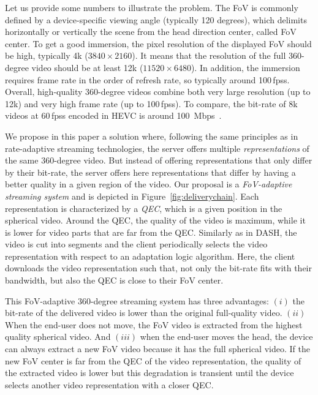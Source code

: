 Let us provide some numbers to illustrate the problem.
The \ac{FoV} is commonly
defined by 
a device-specific viewing angle (typically 120 degrees), which delimits horizontally or 
vertically the scene from the head direction center, called \ac{FoV} center. To get a good 
immersion, the pixel 
resolution of
the displayed \ac{FoV} should be high, typically 4k ($3840\times2160$). It means that
the resolution of the full 360-degree video should be at least 12k ($11520\times6480$). 
In addition, the immersion requires frame rate in the order of refresh rate, so
typically around 100\,\acp{fps}.
Overall, high-quality 360-degree videos combine both very large resolution (up to 12k) 
and very high
frame rate (up to 100\,\acp{fps}). To compare, the bit-rate of 8k videos 
at 60\,\acp{fps} encoded in \ac{HEVC} is around \SI{100}{Mbps}~\cite{7398367}.

We propose in this paper a solution where, following the same principles as in
rate-adaptive streaming technologies, the server offers multiple \emph{representations}
of the same
360-degree video. But instead of offering representations that only differ by
their bit-rate, the server offers here representations that differ by 
having a better quality in a given region of the video.
Our proposal is a \emph{\ac{FoV}-adaptive streaming system} and is depicted in 
Figure~\ref{fig:deliverychain}.
Each representation is characterized by a \emph{\ac{QEC}}, which is a given
position in the spherical video. Around the \ac{QEC}, the quality of the video is maximum,
while it is lower for video parts that are far from the \ac{QEC}. Similarly as 
in \ac{DASH}, the video is cut into segments and the client periodically selects
the video representation with respect to an adaptation logic algorithm. Here, the client downloads 
the video representation
such that, not only the bit-rate fits with their bandwidth, but also
the \ac{QEC} is close to their \ac{FoV} center.



This \ac{FoV}-adaptive 360-degree streaming system has three advantages:
$(i)$ the bit-rate of the delivered video is lower than the original full-quality video.
$(ii)$ When the end-user does not move, the \ac{FoV} video is extracted from the highest
quality spherical video.
And $(iii)$ when the end-user moves the head, the device can
always extract
a new \ac{FoV} video because it has the full spherical video. If the 
new \ac{FoV} center is far from the
\ac{QEC} of the video representation, the quality of the extracted video is lower but this
degradation is transient until the
device selects another video representation with a closer \ac{QEC}.

